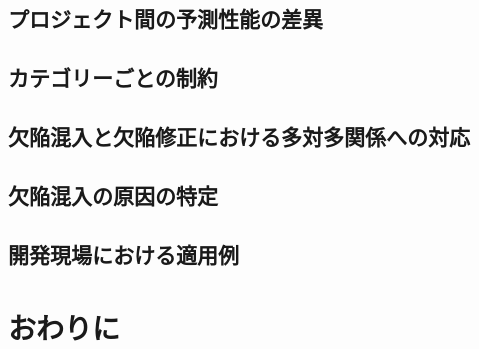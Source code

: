\documentclass[12pt,a4j]{ltjsreport}
\begin{document}
\section{プロジェクト間の予測性能の差異}

\section{カテゴリーごとの制約}

\section{欠陥混入と欠陥修正における多対多関係への対応}

\section{欠陥混入の原因の特定}

\section{開発現場における適用例}

\clearpage

\chapter{おわりに}


\renewcommand{\bibname}{参考文献}



\clearpage
\appendix

\end{document}
